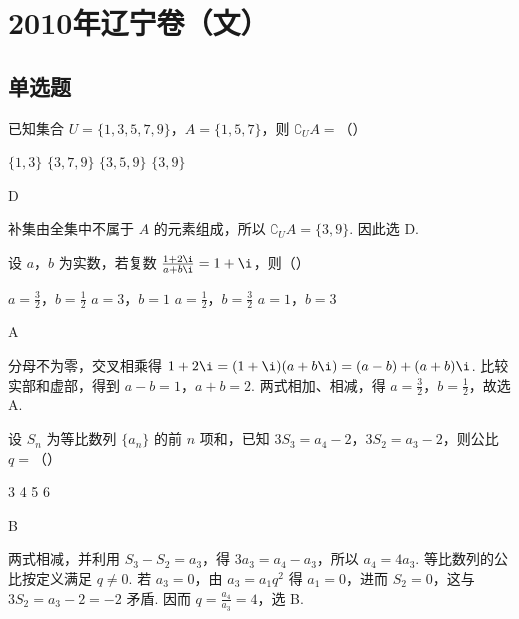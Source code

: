 \chapter{2010年辽宁卷（文）}

\section{单选题}

\begin{problem}
已知集合 \(U=\{1,3,5,7,9\}\)，\(A=\{1,5,7\}\)，则 \(\complement_U A=\)（\quad）

\choices
    {\(\{1,3\}\)}
    {\(\{3,7,9\}\)}
    {\(\{3,5,9\}\)}
    {\(\{3,9\}\)}
\end{problem}

\begin{answer}
D
\end{answer}

\begin{solution}
补集由全集中不属于 \(A\) 的元素组成，所以
\(\complement_U A=\{3,9\}\). 因此选 D.
\end{solution}

\begin{problem}
设 \(a\)，\(b\) 为实数，若复数 \(\frac{1+2\i}{a+b\i}=1+\i\)，则（\quad）

\choices
    {\(a=\frac{3}{2}\)，\(b=\frac{1}{2}\)}
    {\(a=3\)，\(b=1\)}
    {\(a=\frac{1}{2}\)，\(b=\frac{3}{2}\)}
    {\(a=1\)，\(b=3\)}
\end{problem}

\begin{answer}
A
\end{answer}

\begin{solution}
分母不为零，交叉相乘得
\(1+2\i=(1+\i)(a+b\i)=(a-b)+(a+b)\i\). 比较实部和虚部，得到
\(a-b=1\)，\(a+b=2\). 两式相加、相减，得 \(a=\frac{3}{2}\)，\(b=\frac{1}{2}\)，故选 A.
\end{solution}

\begin{problem}
设 \(S_n\) 为等比数列 \(\{a_n\}\) 的前 \(n\) 项和，已知 \(3S_3=a_4-2\)，\(3S_2=a_3-2\)，则公比 \(q=\)（\quad）

\choices
    {3}
    {4}
    {5}
    {6}
\end{problem}

\begin{answer}
B
\end{answer}

\begin{solution}
两式相减，并利用 \(S_3-S_2=a_3\)，得
\(3a_3=a_4-a_3\)，所以 \(a_4=4a_3\). 等比数列的公比按定义满足 \(q\ne0\). 若 \(a_3=0\)，由 \(a_3=a_1q^2\) 得 \(a_1=0\)，进而 \(S_2=0\)，这与 \(3S_2=a_3-2=-2\) 矛盾. 因而
\(q=\frac{a_4}{a_3}=4\)，选 B.
\end{solution}

